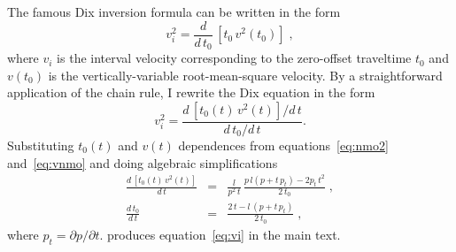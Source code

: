 The famous Dix inversion formula \cite[]{GEO20-01-00680086} can be
written in the form
\begin{equation}
  \label{eq:dix}
  v_i^2 = \frac{d}{d\,t_0}\,\left[t_0\,v^2(t_0)\right]\;,
\end{equation}
where $v_i$ is the interval velocity corresponding to the zero-offset
traveltime $t_0$ and $v(t_0)$ is the vertically-variable
root-mean-square velocity. By a straightforward application of the
chain rule, I rewrite the Dix equation in the form
\begin{equation}
  \label{eq:dix1}
  v_i^2 = \frac{d\,\left[t_0(t)\,v^2(t)\right]/d\,t}
  {d\,t_0/d\,t}.
\end{equation}
Substituting $t_0(t)$ and $v(t)$ dependences from
equations~\ref{eq:nmo2} and~\ref{eq:vnmo} and doing algebraic
simplifications 
\begin{eqnarray}
  \label{eq:dvdt}
  \frac{d\,\left[t_0(t)\,v^2(t)\right]}{d\,t} & = & \frac{l}{p^2\,t}\,
  \frac{p\,l (p + t\,p_t) - 2 p_t\,t^2}{2\,t_0}\;, \\
  \label{eq:dt0dt}
  \frac{d\,t_0}{d\,t} & = & \frac{2\,t - l\,(p + t\,p_t)}{2\,t_0}\;,
\end{eqnarray}
where $p_t = \partial p/\partial t$.  
produces equation~\ref{eq:vi} in the main text.




